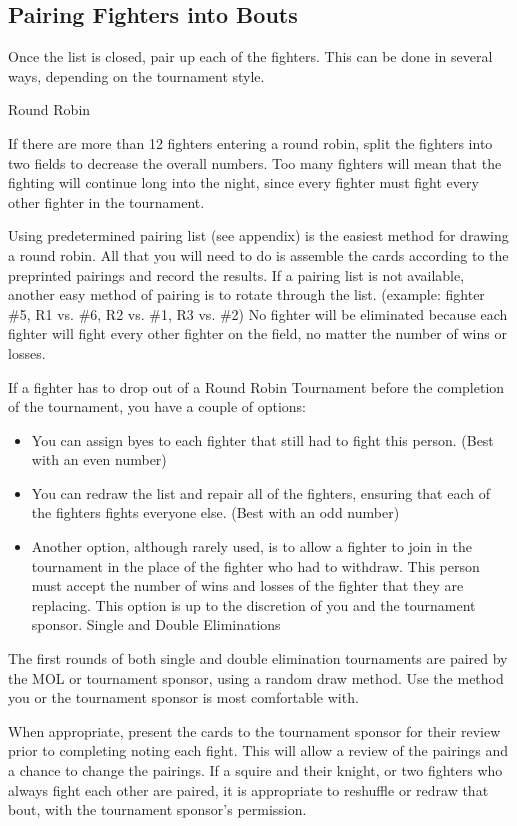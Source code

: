 \documentclass{article}
\begin{document}
\subsection{Pairing Fighters into Bouts}
Once the list is closed, pair up each of the fighters. This can be done in several ways, depending on the
tournament style.

Round Robin

If there are more than 12 fighters entering a round robin, split the fighters into two fields to decrease the
overall numbers. Too many fighters will mean that the fighting will continue long into the night, since
every fighter must fight every other fighter in the tournament.

Using predetermined pairing list (see appendix) is the easiest method for drawing a round robin. All that
you will need to do is assemble the cards according to the preprinted pairings and record the results. If a
pairing list is not available, another easy method of pairing is to rotate through the list. (example: fighter
\#5, R1 vs. \#6, R2 vs. \#1, R3 vs. \#2) No fighter will be eliminated because each fighter will fight every
other fighter on the field, no matter the number of wins or losses.

If a fighter has to drop out of a Round Robin Tournament before the completion of the tournament, you
have a couple of options:
\begin{itemize}
\item You can assign byes to each fighter that still had to fight this person. (Best with an even number)

\item You can redraw the list and repair all of the fighters, ensuring that each of the fighters fights everyone
else. (Best with an odd number)

\item Another option, although rarely used, is to allow a fighter to join in the tournament in the place of the
fighter who had to withdraw. This person must accept the number of wins and losses of the fighter that
they are replacing. This option is up to the discretion of you and the tournament sponsor.
Single and Double Eliminations
\end{itemize}
The first rounds of both single and double elimination tournaments are paired by the MOL or tournament
sponsor, using a random draw method. Use the method you or the tournament sponsor is most
comfortable with.

When appropriate, present the cards to the tournament sponsor for their review prior to completing noting
each fight. This will allow a review of the pairings and a chance to change the pairings. If a squire and
their knight, or two fighters who always fight each other are paired, it is appropriate to reshuffle or redraw
that bout, with the tournament sponsor’s permission.
\end{document}
